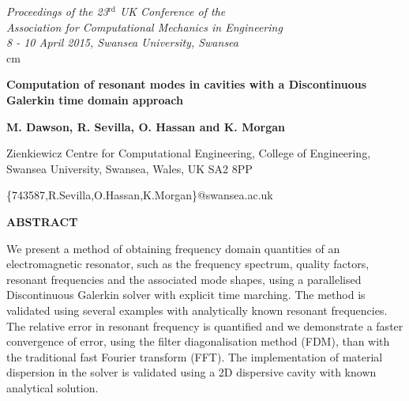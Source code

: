 \documentclass[times,11pt]{ACME2015article}
\begin{document}
\pagestyle{empty}

\begin{flushright}
{\fontsize{8}{10}
\it Proceedings of the 23$^\mathrm{rd}$ UK Conference of the\\
Association for Computational Mechanics in Engineering\\
8 - 10 April 2015, Swansea University, Swansea\\}  cm
\end{flushright}

\begin{center}
{\fontsize{14}{20}\bf Computation of resonant modes in cavities with a Discontinuous Galerkin time domain approach
}\end{center}


\begin{center}
\textbf{M. Dawson, R. Sevilla, O. Hassan and K. Morgan}\\
\end{center}

\begin{center}
{\fontsize{10}{12}
Zienkiewicz Centre for Computational Engineering, College of Engineering, Swansea University, Swansea, Wales, UK SA2 8PP\\
}\end{center}

\begin{center}
\{743587,R.Sevilla,O.Hassan,K.Morgan\}@swansea.ac.uk\\
\end{center}
%
\begin{center}
\textbf{ABSTRACT}\\[1mm]
\end{center}
%

\begin{normalsize}
We present a method of obtaining frequency domain quantities of an electromagnetic resonator, such as the frequency spectrum, quality factors, resonant frequencies and the associated mode shapes, using a parallelised Discontinuous Galerkin solver with explicit time marching. The method is validated using several examples with analytically known resonant frequencies. The relative error in resonant frequency is quantified and we demonstrate a faster convergence of error, using the filter diagonalisation method (FDM), than with the traditional fast Fourier transform (FFT). The implementation of material dispersion in the solver is validated using a 2D dispersive cavity with known analytical solution.
\end{normalsize}
\end{document}
